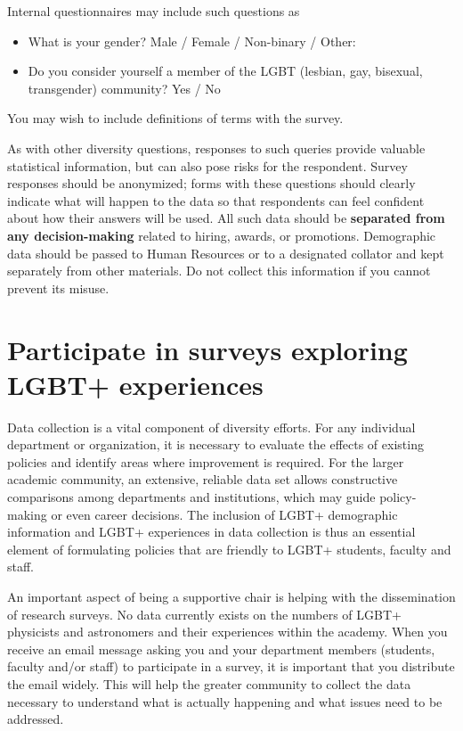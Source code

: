 Internal questionnaires may include such questions as
\begin{itemize}
	\item What is your gender? Male / Female / Non-binary / Other:\noindent\underline{\makebox[0.5in][l]{}}
	\item Do you consider yourself a member of the LGBT (lesbian, gay, bisexual, transgender) community? Yes / No
\end{itemize}

\noindent You may wish to include definitions of terms with the survey.

As with other diversity questions, responses to such queries provide valuable statistical information, but can also pose risks for the respondent. Survey responses should be anonymized; forms with these questions should clearly indicate what will happen to the data so that respondents can feel confident about how their answers will be used. All such data should be \textbf{separated from any decision-making} related to hiring, awards, or promotions. Demographic data should be passed to Human Resources or to a designated collator and kept separately from other materials. Do not collect this information if you cannot prevent its misuse.


\section {Participate in surveys exploring LGBT+ experiences}
\label{surveys}
Data collection is a vital component of diversity efforts. For any individual department or organization, it is necessary to evaluate the effects of existing policies and identify areas where improvement is required. For the larger academic community, an extensive, reliable data set allows constructive comparisons among departments and institutions, which may guide policy-making or even career decisions. The inclusion of LGBT+ demographic information and LGBT+ experiences in data collection is thus an essential element of formulating policies that are friendly to LGBT+ students, faculty and staff.

An important aspect of being a supportive chair is helping with the dissemination of research surveys. No data currently exists on the numbers of LGBT+ physicists and astronomers and their experiences within the academy. When you receive an email message asking you and your department members (students, faculty and/or staff) to participate in a survey, it is important that you distribute the email widely. This will help the greater community to collect the data necessary to understand what is actually happening and what issues need to be addressed.


